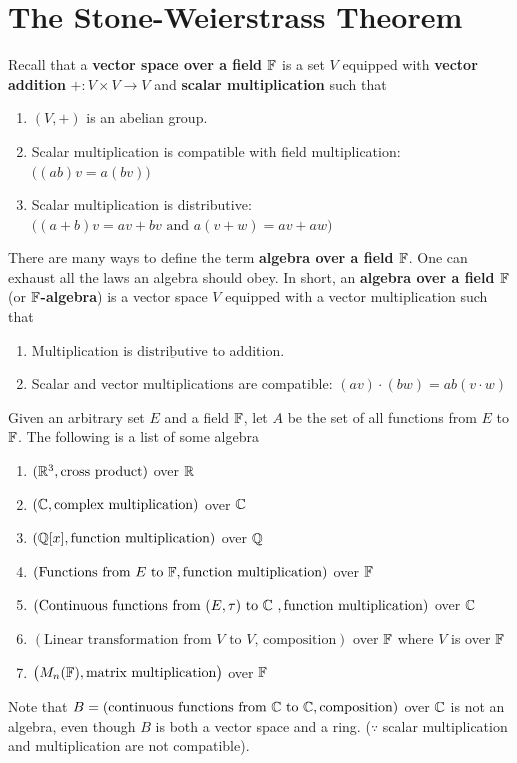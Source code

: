 \documentclass{report}
\begin{document}
\section{The Stone-Weierstrass Theorem}
\begin{mdframed}
Recall that a \textbf{vector space over a field $\mathbb{F}$} is a set $V$ equipped with \textbf{vector addition} $+:V\times V\to V$  and \textbf{scalar multiplication}  such that 
\begin{enumerate}[label=(\alph*)]
  \item $(V,+)$ is an abelian group. 
  \item Scalar multiplication is compatible with field multiplication:   $\Big((ab)v=a(bv) \Big)$
  \item Scalar multiplication is distributive: $\Big((a+b)v=av+bv\text{ and }a(v+w)=av+aw \Big)$
\end{enumerate}

There are many ways to define the term \textbf{algebra over a field $\mathbb{F}$}. One can exhaust all the laws an algebra should obey. In short, an \textbf{algebra over a field $\mathbb{F}$} (or \textbf{$\mathbb{F}$-algebra}) is a vector space $V$ equipped with a vector multiplication such that  
\begin{enumerate}[label=(\roman*)]
  \item Multiplication is $\underline{\text{distributive}}$ to addition. 
   \item Scalar and vector multiplications are compatible: $(av)\cdot (bw)=ab(v\cdot w)$
\end{enumerate}
Given an arbitrary set $E$ and a field $\mathbb{F}$, let $A$ be the set of all functions from  $E$ to $\mathbb{F}$. The following is a list of some algebra 
\begin{enumerate}[label=(\alph*)]
  \item $(\mathbb{R}^3,\text{cross product})$  over $\mathbb{R}$ 
  \item $(\mathbb{C},\text{complex multiplication})$ over $\mathbb{C}$ 
  \item $(\mathbb{Q}[x],\text{function multiplication})$ over $\mathbb{Q}$
  \item $(\text{Functions from }E\text{ to }\mathbb{F},\text{function multiplication})$ over $\mathbb{F}$
  \item $(\text{Continuous functions from $(E,\tau)$ to $\mathbb{C}$ },\text{function multiplication})$ over $\mathbb{C}$  
  \item $(\text{Linear transformation from $V$ to $V$, composition})$ over $\mathbb{F}$ where  $V$ is over $\mathbb{F}$
  \item $\big(M_n(\mathbb{F}),\text{matrix multiplication}\big)$ over $\mathbb{F}$
\end{enumerate}
Note that $B=(\text{continuous functions from }\mathbb{C}\text{ to }\mathbb{C},\text{composition})$ over $\mathbb{C}$ is not an algebra, even though $B$ is both a vector space and a ring. ($\because$ scalar multiplication and multiplication are not compatible).\\


\end{mdframed}
\end{document}
